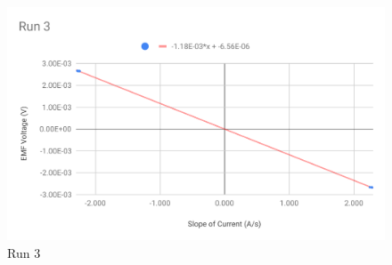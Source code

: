%
\begin{figure}[ht]
	\centering
	\includegraphics[scale=0.74]{image/04-faraday/run-3.pdf}
	\caption{Run 3}
	\label{figure.04.run.3}
\end{figure}